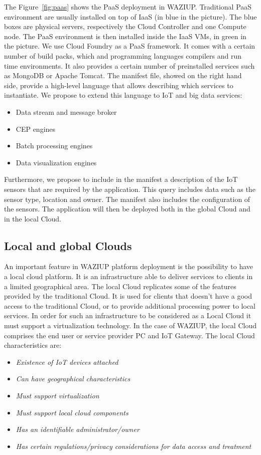 The Figure~\ref{fig:paas} shows the PaaS deployment in WAZIUP.
Traditional PaaS environment are usually installed on top of IaaS (in blue in the picture).
The blue boxes are physical servers, respectively the Cloud Controller and one Compute node.
The PaaS environment is then installed inside the IaaS VMs, in green in the picture.
We use Cloud Foundry as a PaaS framework.
It comes with a certain number of build packs, which and programming languages compilers and run time environments.
It also provides a certain number of preinstalled services such as MongoDB or Apache Tomcat.
The manifest file, showed on the right hand side, provide a high-level language that allows describing which services to instantiate.
We propose to extend this language to IoT and big data services:
\begin{itemize}
  \item Data stream and message broker
  \item CEP engines
  \item Batch processing engines
  \item Data visualization engines
\end{itemize}

Furthermore, we propose to include in the manifest a description of the IoT sensors that are required by the application.
This query includes data such as the sensor type, location and owner.
The manifest also includes the configuration of the sensors.
The application will then be deployed both in the global Cloud and in the local Cloud.

\subsection{Local and global Clouds}

An important feature in WAZIUP platform deployment is the possibility to have a local cloud platform. 
It  is an infrastructure able to deliver services to clients in a limited geographical area. 
The local Cloud replicates some of the features provided by the traditional Cloud. 
It is used for clients that doesn't have a good access to the traditional Cloud, or to provide additional processing power to local services. 
In order for such an infrastructure to be considered as a Local Cloud it must support a virtualization technology. 
In the case of WAZIUP, the local Cloud comprises the end user or service provider PC and IoT Gateway. 
The local Cloud characteristics are:

\begin{itemize}
    \item \emph{Existence of IoT devices attached}
    \item \emph{Can have geographical characteristics}
    \item \emph{Must support virtualization}
    \item \emph{Must support local cloud components}
    \item \emph{Has an identifiable administrator/owner}
    \item \emph{Has certain regulations/privacy considerations for data access and treatment}
\end{itemize}

